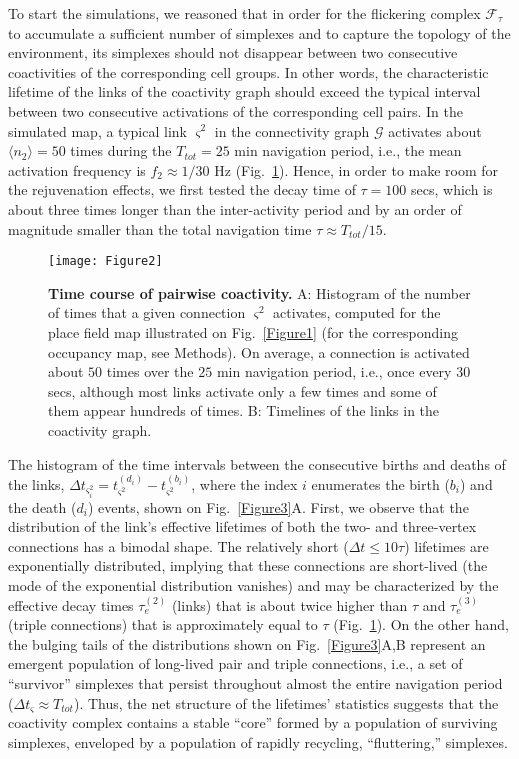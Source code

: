 \documentclass[12pt,tightenlines]{revtex4}
\begin{document}
To start the simulations, we reasoned that in order for the flickering complex $\mathcal{F}_{\tau}$ to accumulate a 
sufficient number of simplexes and to capture the topology of the environment, its simplexes should not disappear 
between two consecutive coactivities of the corresponding cell groups. In other words, the characteristic lifetime of the 
links of the coactivity graph should exceed the typical interval between two consecutive activations of the corresponding 
cell pairs. In the simulated map, a typical link $\varsigma^2$ in the connectivity graph $\mathcal{G}$ activates about 
$\langle n_2 \rangle = 50$ times during the $T_{tot} = 25$ min navigation period, i.e., the mean activation frequency 
is $f_2 \approx 1/30$ Hz (Fig.~\ref{Figure2}). Hence, in order to make room for the rejuvenation effects, we first tested 
the decay time of $\tau = 100$ secs, which is about three times longer than the inter-activity period and by an order of 
magnitude smaller than the total navigation time $\tau \approx T_{tot}/15$. 

\begin{figure}[!h]
\texttt{[image: Figure2]}
\caption{{\footnotesize\textbf{Time course of pairwise coactivity.} A: Histogram of the number of times that a given connection 
$\varsigma^2$ activates, computed for the place field map illustrated on Fig.~\ref{Figure1} (for the corresponding occupancy map, 
see Methods). 
On average, a connection is activated about $50$ times over the $25$ min navigation period, i.e., once every $30$ secs, although 
most links activate only a few times and some of them appear hundreds of times. B: Timelines of the links in the coactivity graph.}}
\label{Figure2}
\end{figure}

The histogram of the time intervals between the consecutive births and deaths of the links, 
$\Delta t_{\varsigma^2_i} = t^{(d_i)}_{\varsigma^2} - t^{(b_i)}_{\varsigma^2}$, where the index $i$ enumerates 
the birth ($b_i$) and the death ($d_i$) events, shown on Fig.~\ref{Figure3}A. First, we observe that the distribution of 
the link's effective lifetimes of both the two- and three-vertex connections has a bimodal shape. The relatively short 
($\Delta t \leq 10\tau$) lifetimes are exponentially distributed, implying that these connections are short-lived (the mode 
of the exponential distribution vanishes) and may be characterized by the effective decay times $\tau^{(2)}_{e}$ (links) 
that is about twice higher than $\tau$ and $\tau^{(3)}_{e}$ (triple connections) that is approximately equal to $\tau$ 
(Fig.~\ref{Figure2}). 
On the other hand, the bulging tails of the distributions shown on Fig.~\ref{Figure3}A,B represent an emergent population 
of long-lived pair and triple connections, i.e., a set of ``survivor'' simplexes that persist throughout almost the entire 
navigation period ($\Delta t_{\varsigma} \approx T_{tot}$). Thus, the net structure of the lifetimes' statistics suggests 
that the coactivity complex contains a stable ``core'' formed by a population of surviving simplexes, enveloped by a 
population of  rapidly recycling, ``fluttering,'' simplexes.
\end{document}
